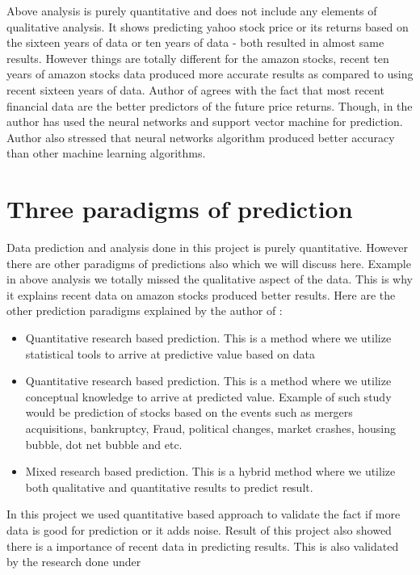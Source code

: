 Above analysis is purely quantitative and does not include any elements of qualitative analysis. It shows predicting yahoo stock price or 
its returns based on the sixteen years of data or ten years of data - both resulted in almost same results. However things are totally 
different for the amazon stocks, recent ten years of amazon stocks data produced more accurate results as compared to using recent sixteen years 
of data. Author of \cite{Ref14} agrees with the fact that most recent financial data are the better predictors of the future price returns. Though, 
in the \cite{Ref14} author has used the neural networks and support vector machine for prediction. Author also stressed that neural networks algorithm
produced better accuracy than other machine learning algorithms. 

\section{Three paradigms of prediction}

Data prediction and analysis done in this project is purely quantitative. However there are other paradigms of predictions also which we will discuss here. 
Example in above analysis we totally missed the qualitative aspect of the data. This is why it explains recent data on amazon stocks produced better results. 
Here are the other prediction paradigms explained by the author of \cite{Ref15} : 

\begin{itemize}
\item Quantitative research based prediction. This is a method where we utilize statistical tools to arrive at predictive value based on data
\item Quantitative research based prediction. This is a method where we utilize conceptual knowledge to arrive at predicted value. Example of such study would be
      prediction of stocks based on the events such as mergers acquisitions, bankruptcy, Fraud, political changes, market crashes, housing bubble, dot net bubble and etc.
\item Mixed research based prediction. This is a hybrid method where we utilize both qualitative and quantitative results to predict result. 
\end{itemize}

In this project we used quantitative based approach to validate the fact if more data is good for prediction or it adds noise. Result of this project also showed
there is a importance of recent data in predicting results. This is also validated by the research done under \cite{Ref14}


